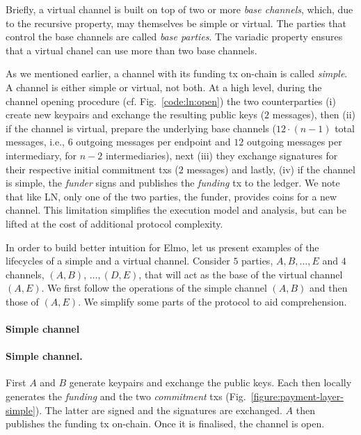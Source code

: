   Briefly, a virtual channel is built on top of two or more \emph{base
  channels}, which, due to the recursive property, may themselves be simple or
  virtual. The parties that control the base channels are called \emph{base
  parties}. The variadic property ensures that a virtual chanel can use more than two base channels.

  As we mentioned earlier, a channel with its funding tx on-chain is
  called \emph{simple}. A channel is either simple or virtual, not both. At a
  high level, during the channel opening procedure (cf.
  Fig.~\ref{code:ln:open}) the two counterparties (i) create new keypairs and
  exchange the resulting public keys ($2$ messages), then (ii) if the channel is
  virtual, prepare the underlying base channels ($12 \cdot (n-1)$ total
  messages, i.e., $6$ outgoing messages per endpoint and $12$ outgoing messages
  per intermediary, for $n-2$ intermediaries), next (iii) they exchange
  signatures for their respective initial commitment txs ($2$ messages)
  and lastly, (iv) if the channel is simple, the \emph{funder} signs and
  publishes the \emph{funding} tx to the ledger. We note that like LN,
  only one of the two parties, the funder, provides coins for a new channel.
  This limitation simplifies the execution model and analysis, but can be lifted
  at the cost of additional protocol complexity.

  In order to build better intuition for Elmo, let us present examples of the
  lifecycles of a simple and a virtual channel. Consider $5$ parties, $A, B,
  \dots, E$ and $4$ channels, $(A, B)$, $\dots,(D, E)$, that will act as
  the base of the virtual channel $(A, E)$. We first follow the operations of
  the simple channel $(A, B)$ and then those of $(A, E)$. We simplify some parts
  of the protocol to aid comprehension.

  \makeatletter%
    {\paragraph{Simple channel}}%
    {\paragraph{Simple channel.}}%
  \makeatother%
  First $A$ and $B$ generate keypairs and exchange the public keys. Each then
  locally generates the \emph{funding} and the two \emph{commitment} txs
  (Fig.~\ref{figure:payment-layer-simple}). The latter are signed and the
  signatures are exchanged. $A$ then publishes the funding tx on-chain. Once it
  is finalised, the channel is open.

